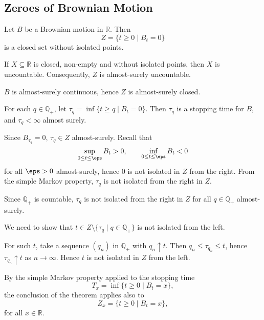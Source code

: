 \documentclass[12pt]{article}
\begin{document}

\subsection{Zeroes of Brownian Motion}%
\label{sub:zob}

\begin{theorem}
	Let $B$ be a Brownian motion in $\mathbb{R}$. Then
	\[
	Z = \{t \geq 0 \mid B_t = 0\}
	\]
	is a closed set without isolated points.
\end{theorem}

\begin{remark}
	If $X \subseteq \mathbb{R}$ is closed, non-empty and without isolated points, then $X$ is uncountable. Consequently, $Z$ is almost-surely uncountable.
\end{remark}

\begin{proofbox}
	$B$ is almost-surely continuous, hence $Z$ is almost-surely closed.

	For each $q \in \mathbb{Q}_+$, let $\tau_q = \inf\{t \geq q \mid B_t = 0\}$. Then $\tau_q$ is a stopping time for $B$, and $\tau_q < \infty$ almost surely.

	Since $B_{\tau_q} = 0$, $\tau_q \in Z$ almost-surely. Recall that
	\[
	\sup_{0 \leq t \leq \eps} B_t > 0, \qquad \inf_{0 \leq t \leq \eps} B_t < 0
	\]
	for all $\eps > 0$ almost-surely, hence $0$ is not isolated in $Z$ from the right. From the simple Markov property, $\tau_q$ is not isolated from the right in $Z$.

	Since $\mathbb{Q}_+$ is countable, $\tau_q$ is not isolated from the right in $Z$ for all $q \in \mathbb{Q}_+$ almost-surely.

	We need to show that $t \in Z \setminus \{\tau_q \mid q \in \mathbb{Q}_+\}$ is not isolated from the left.

	For such $t$, take a sequence $(q_n)$ in $\mathbb{Q}_+$ with $q_n \uparrow t$. Then $q_n \leq \tau_{q_n} \leq t$, hence $\tau_{q_n} \uparrow t$ as $n \to \infty$. Hence $t$ is not isolated in $Z$ from the left.
\end{proofbox}

\begin{remark}
	By the simple Markov property applied to the stopping time
	\[
		T_x = \inf\{t \geq 0 \mid B_t = x\},
	\]
	the conclusion of the theorem applies also to
	\[
		Z_x = \{t \geq 0 \mid B_t = x\},
	\]
	for all $x \in \mathbb{R}$.
\end{remark}
\end{document}
